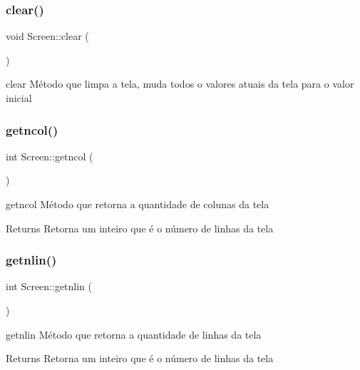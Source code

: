 \subsubsection{\texorpdfstring{clear()}{clear()}}
{\footnotesize\ttfamily void Screen\+::clear (\begin{DoxyParamCaption}{ }\end{DoxyParamCaption})}



clear Método que limpa a tela, muda todos o valores atuais da tela para o valor inicial 

\mbox{\label{class_screen_abaae93e39587a865d4ac1f7fa1a501c2}} 
\subsubsection{\texorpdfstring{getncol()}{getncol()}}
{\footnotesize\ttfamily int Screen\+::getncol (\begin{DoxyParamCaption}{ }\end{DoxyParamCaption})}



getncol Método que retorna a quantidade de colunas da tela 

\begin{DoxyReturn}{Returns}
Retorna um inteiro que é o número de linhas da tela 
\end{DoxyReturn}
\mbox{\label{class_screen_ac247e58a4575bbafa46b9f9d24841538}} 
\subsubsection{\texorpdfstring{getnlin()}{getnlin()}}
{\footnotesize\ttfamily int Screen\+::getnlin (\begin{DoxyParamCaption}{ }\end{DoxyParamCaption})}



getnlin Método que retorna a quantidade de linhas da tela 

\begin{DoxyReturn}{Returns}
Retorna um inteiro que é o número de linhas da tela 
\end{DoxyReturn}
\mbox{\label{class_screen_ad0d7ac072702d42e6a920a806fbc79e2}} 
